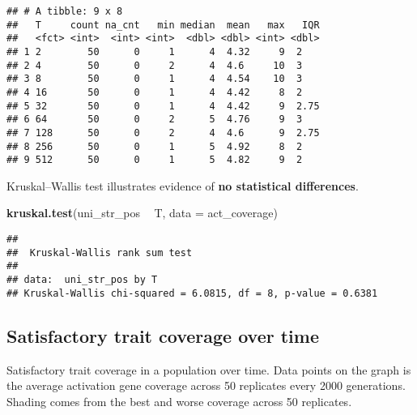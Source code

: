 \documentclass[]{book}
\newenvironment{Shaded}{\begin{snugshade}}{\end{snugshade}}
\newcommand{\DataTypeTok}[1]{\textcolor[rgb]{0.13,0.29,0.53}{#1}}
\newcommand{\KeywordTok}[1]{\textcolor[rgb]{0.13,0.29,0.53}{\textbf{#1}}}
\newcommand{\NormalTok}[1]{#1}
\newcommand{\OperatorTok}[1]{\textcolor[rgb]{0.81,0.36,0.00}{\textbf{#1}}}
\newcommand{\StringTok}[1]{\textcolor[rgb]{0.31,0.60,0.02}{#1}}
\begin{document}
\begin{verbatim}
## # A tibble: 9 x 8
##   T     count na_cnt   min median  mean   max   IQR
##   <fct> <int>  <int> <int>  <dbl> <dbl> <int> <dbl>
## 1 2        50      0     1      4  4.32     9  2   
## 2 4        50      0     2      4  4.6     10  3   
## 3 8        50      0     1      4  4.54    10  3   
## 4 16       50      0     1      4  4.42     8  2   
## 5 32       50      0     1      4  4.42     9  2.75
## 6 64       50      0     2      5  4.76     9  3   
## 7 128      50      0     2      4  4.6      9  2.75
## 8 256      50      0     1      5  4.92     8  2   
## 9 512      50      0     1      5  4.82     9  2
\end{verbatim}

Kruskal--Wallis test illustrates evidence of \textbf{no statistical differences}.

\begin{Shaded}
\begin{Highlighting}[]
\KeywordTok{kruskal.test}\NormalTok{(uni_str_pos }\OperatorTok{~}\StringTok{ }\NormalTok{T, }\DataTypeTok{data =}\NormalTok{ act_coverage)}
\end{Highlighting}
\end{Shaded}

\begin{verbatim}
## 
##  Kruskal-Wallis rank sum test
## 
## data:  uni_str_pos by T
## Kruskal-Wallis chi-squared = 6.0815, df = 8, p-value = 0.6381
\end{verbatim}

\hypertarget{satisfactory-trait-coverage-over-time-1}{%
\subsection{Satisfactory trait coverage over time}\label{satisfactory-trait-coverage-over-time-1}}

Satisfactory trait coverage in a population over time.
Data points on the graph is the average activation gene coverage across 50 replicates every 2000 generations.
Shading comes from the best and worse coverage across 50 replicates.

\begin{Shaded}
\end{Shaded}
\end{document}

